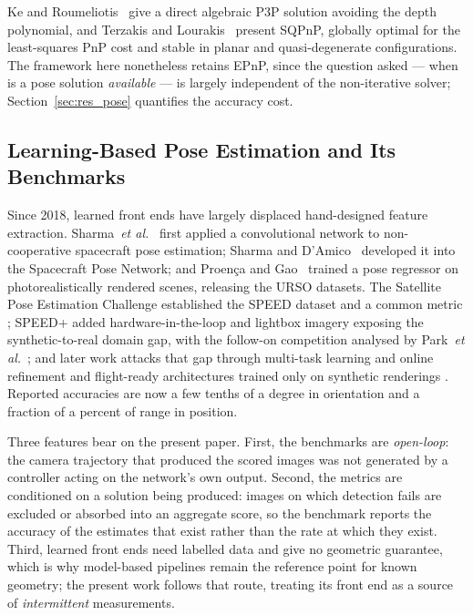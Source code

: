 Ke and Roumeliotis~\cite{ke2017ap3p} give a direct algebraic P3P solution
avoiding the depth polynomial, and Terzakis and
Lourakis~\cite{terzakis2020sqpnp} present SQPnP, globally optimal for the
least-squares PnP cost and stable in planar and quasi-degenerate
configurations. The framework here nonetheless retains EPnP, since the
question asked --- when is a pose solution \emph{available} --- is largely
independent of the non-iterative solver; Section~\ref{sec:res_pose} quantifies
the accuracy cost.

\subsection{Learning-Based Pose Estimation and Its Benchmarks}
\label{sec:rw_learned}

Since 2018, learned front ends have largely displaced hand-designed feature
extraction. Sharma~\textit{et al.}~\cite{sharma2018} first applied a
convolutional network to non-cooperative spacecraft pose estimation; Sharma
and D'Amico~\cite{sharma2020nn} developed it into the Spacecraft Pose Network;
and Proen{\c{c}}a and Gao~\cite{proenca2020urso} trained a pose regressor on
photorealistically rendered scenes, releasing the URSO datasets. The Satellite
Pose Estimation Challenge established the SPEED dataset and a common metric
\cite{kisantal2020}; SPEED+ \cite{park2022speedplus} added
hardware-in-the-loop and lightbox imagery exposing the synthetic-to-real
domain gap, with the follow-on competition analysed by Park~\textit{et
al.}~\cite{park2023spec2021}; and later work attacks that gap through
multi-task learning and online refinement \cite{park2024spnv2} and
flight-ready architectures trained only on synthetic renderings
\cite{park2026spnv3}. Reported accuracies are now a few tenths of a degree in
orientation and a fraction of a percent of range in position.

Three features bear on the present paper. First, the benchmarks are
\emph{open-loop}: the camera trajectory that produced the scored images was
not generated by a controller acting on the network's own output. Second, the
metrics are conditioned on a solution being produced: images on which
detection fails are excluded or absorbed into an aggregate score, so the
benchmark reports the accuracy of the estimates that exist rather than the
rate at which they exist. Third, learned front ends need labelled data and
give no geometric guarantee, which is why model-based pipelines remain the
reference point for known geometry; the present work follows that route,
treating its front end as a source of \emph{intermittent} measurements.

